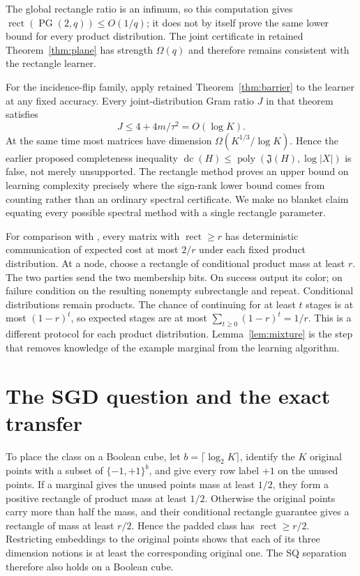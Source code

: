 \documentclass[11pt]{article}
\DeclareMathOperator{\dc}{dc}
\DeclareMathOperator{\rect}{rect}
\newcommand{\1}{\mathbf 1}
\begin{document}
The global rectangle ratio is an infimum, so this computation gives $\rect(\operatorname{PG}(2,q))\le O(1/q)$; it does not by itself prove the same lower bound for every product distribution. The joint certificate in retained Theorem~\ref{thm:plane} has strength $\Omega(q)$ and therefore remains consistent with the rectangle learner.

For the incidence-flip family, apply retained Theorem~\ref{thm:barrier} to the learner at any fixed accuracy. Every joint-distribution Gram ratio $J$ in that theorem satisfies
\[
 J\le4+4m/\tau^2=O(\log K).
\]
At the same time most matrices have dimension $\Omega(K^{1/3}/\log K)$. Hence the earlier proposed completeness inequality $\dc(H)\le\operatorname{poly}(\mathfrak J(H),\log|X|)$ is false, not merely unsupported. The rectangle method proves an upper bound on learning complexity precisely where the sign-rank lower bound comes from counting rather than an ordinary spectral certificate. We make no blanket claim equating every possible spectral method with a single rectangle parameter.

For comparison with \citet[Proposition 3.14]{HHPTZ22}, every matrix with $\rect\ge r$ has deterministic communication of expected cost at most $2/r$ under each fixed product distribution. At a node, choose a rectangle of conditional product mass at least $r$. The two parties send the two membership bits. On success output its color; on failure condition on the resulting nonempty subrectangle and repeat. Conditional distributions remain products. The chance of continuing for at least $t$ stages is at most $(1-r)^t$, so expected stages are at most $\sum_{t\ge0}(1-r)^t=1/r$. This is a different protocol for each product distribution. Lemma~\ref{lem:mixture} is the step that removes knowledge of the example marginal from the learning algorithm.

\section{The SGD question and the exact transfer}
To place the class on a Boolean cube, let $b=\lceil\log_2 K\rceil$, identify the $K$ original points with a subset of $\{-1,+1\}^b$, and give every row label $+1$ on the unused points. If a marginal gives the unused points mass at least $1/2$, they form a positive rectangle of product mass at least $1/2$. Otherwise the original points carry more than half the mass, and their conditional rectangle guarantee gives a rectangle of mass at least $r/2$. Hence the padded class has $\rect\ge r/2$. Restricting embeddings to the original points shows that each of its three dimension notions is at least the corresponding original one. The SQ separation therefore also holds on a Boolean cube.
\end{document}

